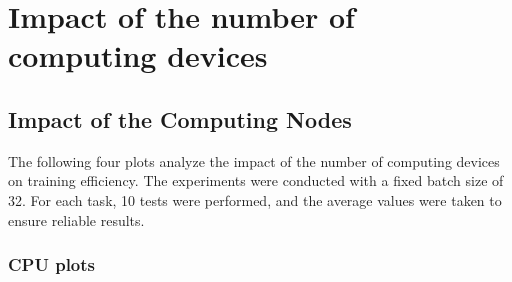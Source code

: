 \documentclass{article}
\begin{document}
\section{Impact of the number of computing devices}

\subsection{Impact of the Computing Nodes}
The following four plots analyze the impact of the number of computing devices on training efficiency. The experiments were conducted with a fixed batch size of 32. For each task, 10 tests were performed, and the average values were taken to ensure reliable results.


\subsubsection{CPU plots}
\end{document}
